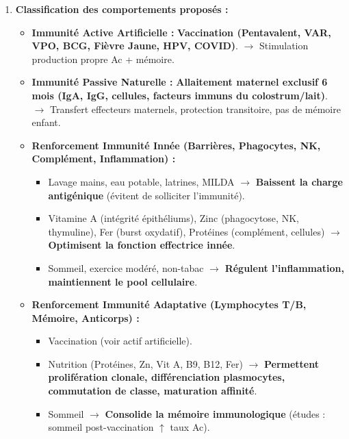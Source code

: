 \documentclass[11pt]{article}
\begin{document}
\begin{exoresolu}
\begin{enumerate}
\begin{center}
\begin{tabularx}{\linewidth}{|l|X|X|X|}
        \end{tabularx}
        \end{center}
        \item \textbf{Classification des comportements proposés :}
        \begin{itemize}
            \item \textbf{Immunité Active Artificielle :} \textbf{Vaccination (Pentavalent, VAR, VPO, BCG, Fièvre Jaune, HPV, COVID)}. $\rightarrow$ Stimulation production propre Ac + mémoire.
            \item \textbf{Immunité Passive Naturelle :} \textbf{Allaitement maternel exclusif 6 mois (IgA, IgG, cellules, facteurs immuns du colostrum/lait)}. $\rightarrow$ Transfert effecteurs maternels, protection transitoire, pas de mémoire enfant.
            \item \textbf{Renforcement Immunité Innée (Barrières, Phagocytes, NK, Complément, Inflammation) :} 
                \begin{itemize}
                    \item Lavage mains, eau potable, latrines, MILDA $\rightarrow$ \textbf{Baissent la charge antigénique} (évitent de solliciter l'immunité).
                    \item Vitamine A (intégrité épithéliums), Zinc (phagocytose, NK, thymuline), Fer (burst oxydatif), Protéines (complément, cellules) $\rightarrow$ \textbf{Optimisent la fonction effectrice innée}.
                    \item Sommeil, exercice modéré, non-tabac $\rightarrow$ \textbf{Régulent l'inflammation, maintiennent le pool cellulaire}.
                \end{itemize}
            \item \textbf{Renforcement Immunité Adaptative (Lymphocytes T/B, Mémoire, Anticorps) :} 
                \begin{itemize}
                    \item Vaccination (voir actif artificielle).
                    \item Nutrition (Protéines, Zn, Vit A, B9, B12, Fer) $\rightarrow$ \textbf{Permettent prolifération clonale, différenciation plasmocytes, commutation de classe, maturation affinité}.
                    \item Sommeil $\rightarrow$ \textbf{Consolide la mémoire immunologique} (études : sommeil post-vaccination $\uparrow$ taux Ac).
                \end{itemize}
        \end{itemize}

\end{enumerate}
\end{exoresolu}
\end{document}

